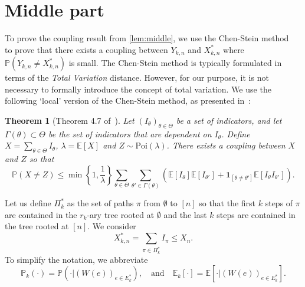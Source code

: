 \documentclass[11pt]{article}
\newtheorem{theorem}{Theorem}
\theoremstyle{definition}
\theoremstyle{remark}
\theoremstyle{remark}
\numberwithin{theorem}{section}
\providecommand{\P}{}
\renewcommand{\P}{\mathbb{P}}
\newcommand{\E}{\mathbb{E}}
\newcommand{\I}[1]{{\mathbf 1}_{[#1]}}
\begin{document}
\section{Middle part}\label{sec:middle-part}
To prove the coupling result from \cref{lem:middle}, we use the Chen-Stein method~\citep{arratia1990poisson} to prove that there exists a coupling between $Y_{k,n}$ and $X_{k,n}^{*}$ where $\P(Y_{k,n}\neq X_{k,n}^{*})$ is small. The Chen-Stein method is typically formulated in terms of the \emph{Total Variation} distance. However, for our purpose, it is not necessary to formally introduce the concept of total variation. 
We use the following `local' version of the Chen-Stein method, as presented in~\cite{ross2011fundamentals}:
\begin{theorem}[Theorem 4.7 of~\cite{ross2011fundamentals}]\label{thm:chen-stein}
    Let $(I_\theta)_{\theta\in\Theta}$ be a set of indicators, and let $\Gamma(\theta)\subset\Theta$ be the set of indicators that are dependent on $I_\theta$. Define $X=\sum_{\theta\in\Theta}I_\theta$, $\lambda=\mathbb{E}[X]$ and $Z\sim\text{Poi}(\lambda)$. There exists a coupling between $X$ and $Z$ so that
    \[
    \P(X\neq Z)\le\min\left\{1,\frac{1}{\lambda}\right\}\sum_{\theta\in\Theta}\sum_{\theta'\in \Gamma(\theta)}\left(\mathbb{E}[I_\theta]\mathbb{E}[I_{\theta'}]+\I{\theta\neq\theta'}\mathbb{E}[I_\theta I_{\theta'}]\right).
    \]
\end{theorem}

Let us define $\Pi^*_{k}$ as the set of paths $\pi$ from $\emptyset$ to $[n]$ so that the first $k$ steps of $\pi$ are contained in the $r_k$-ary tree rooted at $\emptyset$ and the last $k$ steps are contained in the tree rooted at $[n]$.
We consider
\[
X_{k,n}^{*}=\sum_{\pi\in \Pi^*_{k}}I_\pi\le X_n.
\]
To simplify the notation, we abbreviate
    \[
        \P_k(\cdot)=\P(\cdot|(W(e))_{e\in E_k^*}),\quad\text{and}\quad 
        \E_k[\cdot]=\E[\cdot|(W(e))_{e\in E_k^*}].
    \]
\end{document}
